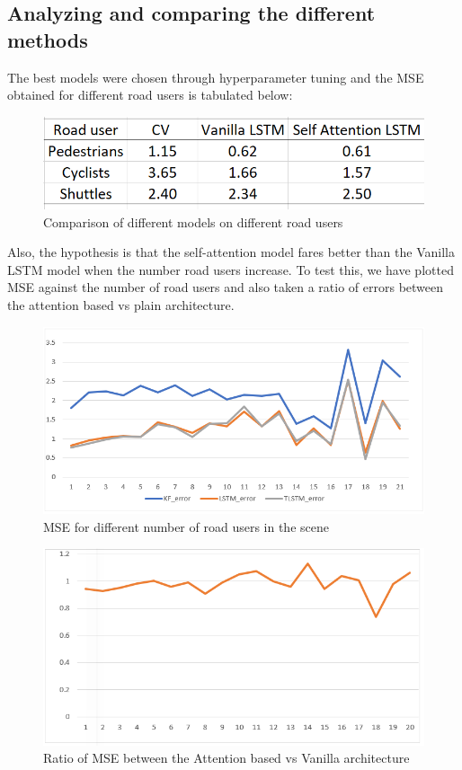 \documentclass{article}
\begin{document}
\subsection{Analyzing and comparing the different methods}
The best models were chosen through hyperparameter tuning and the MSE obtained for different road users is tabulated below:
\begin{figure}[H]
\centering
\includegraphics[scale=0.6]{result/res3.png}
\caption{Comparison of different models on different road users}
\end{figure}
Also, the hypothesis is that the self-attention model fares better than the Vanilla LSTM model when the number road users increase. To test this, we have plotted MSE against the number of road users and also taken a ratio of errors between the attention based vs plain architecture. 
\begin{figure}[H]
\centering
\includegraphics[scale=0.6]{result/res4.png}
\caption{MSE for different number of road users in the scene}
\end{figure}

\begin{figure}[H]
\centering
\includegraphics[scale=0.6]{result/res5.png}
\caption{Ratio of MSE between the Attention based vs Vanilla architecture}
\end{figure}




\printbibliography %
\end{document}
